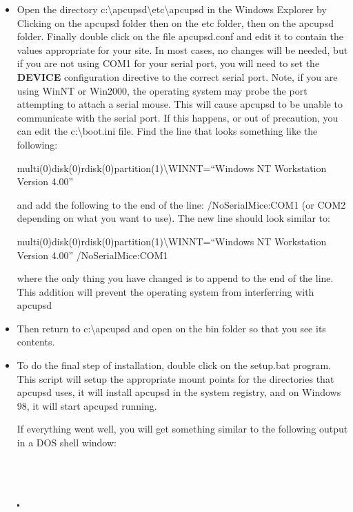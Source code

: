 \begin{itemize}
\item Open the directory
c:\textbackslash{}apcupsd\textbackslash{}etc\textbackslash{}apcupsd in the
Windows Explorer by Clicking on the apcupsd folder then on the etc folder,
then on the apcupsd folder. Finally double click on the file apcupsd.conf and
edit it to contain the values appropriate for your site. In most cases, no
changes will be needed, but if you are not using COM1 for your serial port,
you will need to set the {\bf DEVICE} configuration directive to the correct
serial port. Note, if you are using WinNT or Win2000, the operating system may
probe the port attempting to attach a serial mouse. This will cause apcupsd to
be unable to communicate with the serial port. If this happens, or out of
precaution, you can edit the c:\textbackslash{}boot.ini file. Find the line
that looks something like the following:  

multi(0)disk(0)rdisk(0)partition(1)\textbackslash{}WINNT=``Windows NT
Workstation Version 4.00''  

and add the following to the end of the line: /NoSerialMice:COM1 (or COM2
depending on what you want to use). The new line should look similar to:  

multi(0)disk(0)rdisk(0)partition(1)\textbackslash{}WINNT=``Windows NT
Workstation Version 4.00'' /NoSerialMice:COM1  

where the only thing you have changed is to append to the end of the line.
This addition will prevent the operating system from interferring with apcupsd
 
\item Then return to c:\textbackslash{}apcupsd and open on the bin folder so
that you see its contents.  
\item To do the final step of installation, double click on the setup.bat
program. This script will setup the appropriate mount points for the
directories that apcupsd uses, it will install apcupsd in the system registry,
and on Windows 98, it will start apcupsd running.  

If everything went well, you will get something similar to the following
output in a DOS shell window:  

\footnotesize
\begin{verbatim}
     
     
\end{verbatim}
\normalsize

\includegraphics{./wininstall1.eps}  


\end{itemize}
